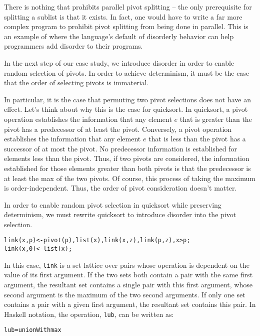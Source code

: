 There is nothing that prohibits parallel pivot splitting -- the only prerequisite for splitting a sublist is that it exists.  In fact, one would have to write a far more complex program to prohibit pivot splitting from being done in parallel.  This is an example of where the language's default of disorderly behavior can help programmers add disorder to their programs.

In the next step of our case study, we introduce disorder in order to enable random selection of pivots.  In order to achieve determinism, it must be the case that the order of selecting pivots is immaterial.

In particular, it is the case that permuting two pivot selections does not have an effect.  Let's think about why this is the case for quicksort. In quicksort, a pivot operation establishes the information that any element $e$ that is greater than the pivot has a predecessor of at least the pivot.  Conversely, a pivot operation establishes the information that any element $e$ that is less than the pivot has a successor of at most the pivot.  No predecessor information is established for elements less than the pivot.  Thus, if two pivots are considered, the information established for those elements greater than both pivots is that the predecessor is at least the max of the two pivots.  Of course, this process of taking the maximum is order-independent.  Thus, the order of pivot consideration doesn't matter.

In order to enable random pivot selection in quicksort while preserving determinism, we must rewrite quicksort to introduce disorder into the pivot selection.

\begin{alltt}
link(x,p) <- pivot(p), list(x), link(x,z), link(p,z), x > p;
link(x,0) <- list(x);
\end{alltt}

In this case, {\tt link} is a set lattice over pairs whose operation is dependent on the value of its first argument.  If the two sets both contain a pair with the same first argument, the resultant set contains a single pair with this first argument, whose second argument is the maximum of the two second arguments.  If only one set contains a pair with a given first argument, the resultant set contains this pair.  In Haskell notation, the operation, {\tt lub}, can be written as:
\begin{alltt}
lub = unionWith max
\end{alltt}

